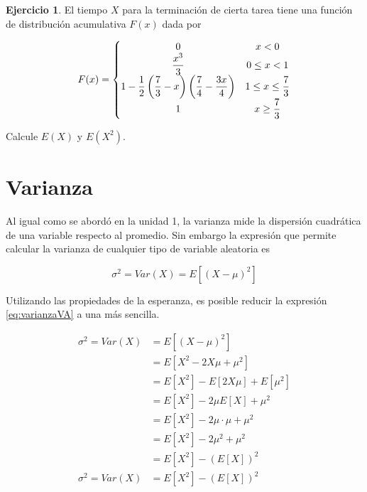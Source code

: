 \documentclass[
  11pt,
]{book}
\theoremstyle{definition}
\theoremstyle{definition}
\theoremstyle{definition}
\newtheorem{exercise}{Ejercicio}[chapter]
\theoremstyle{definition}
\theoremstyle{remark}
\begin{document}
\begin{exercise}
\protect\hypertarget{exr:exesperanza5}{}\label{exr:exesperanza5}El tiempo \(X\) para la terminación de cierta tarea tiene una función de distribución acumulativa \(F(x)\) dada por

\begin{equation}
\notag
F(x) = \left\lbrace
\begin{matrix}
0 & x < 0\\
\displaystyle\frac{x^3}{3} & 0 \leq x < 1\\
1-\displaystyle\frac{1}{2}\left(\displaystyle\frac{7}{3}-x \right)\left(\displaystyle\frac{7}{4}-\displaystyle\frac{3x}{4}\right) & 1\leq x \leq \displaystyle\frac{7}{3}\\
1 & x \geq \displaystyle\frac{7}{3}
\end{matrix}
\right.
\end{equation}

Calcule \(E(X)\) y \(E(X^2)\).
\end{exercise}

\section{Varianza}\label{probabilidad-varianza}

Al igual como se abordó en la unidad 1, la varianza mide la dispersión cuadrática de una variable respecto al promedio. Sin embargo la expresión que permite calcular la varianza de cualquier tipo de variable aleatoria es

\begin{equation}
\sigma^2 = Var(X) = E[(X-\mu)^2]
\label{eq:varianzaVA}
\end{equation}

Utilizando las propiedades de la esperanza, es posible reducir la expresión \eqref{eq:varianzaVA} a una más sencilla.

\begin{equation}
\begin{split}
\sigma^2 = Var(X) &= E[(X-\mu)^2]\\
&= E[X^2-2X\mu + \mu^2]\\
&= E[X^2]-E[2X\mu] + E[\mu^2]\\
&= E[X^2]-2\mu E[X] + \mu^2\\
&= E[X^2]-2\mu \cdot \mu + \mu^2\\
&= E[X^2]-2\mu^2 + \mu^2\\
&= E[X^2]-(E[X])^2\\
\sigma^2 = Var(X) &= E[X^2]-(E[X])^2\\
\end{split}
\label{eq:varianzaSimplificada}
\end{equation}
\end{document}
